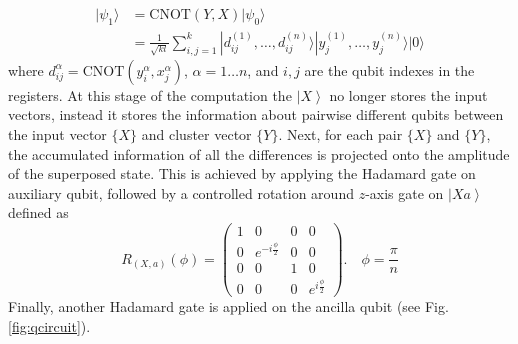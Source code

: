 \documentclass[pra,showkeys,twocolumn,showpacs]{revtex4-1}
\begin{document}
\begin{align}
    | \psi_1 \rangle & = 
    \mathrm{CNOT} (Y,X)| \psi_0 \rangle \nonumber \\
		& =  
    \frac{1}{\sqrt{kl}} \sum_{i, j=1}^{k} 
    | d^{(1)}_{ij}, \dots, d^{(n)}_{ij} \rangle 
    | y^{(1)}_j, \dots, y^{(n)}_j \rangle
    | 0 \rangle 
\end{align}
%
where $d^\alpha_{ij} = \mathrm{CNOT}(y^\alpha_i, x^\alpha_j)$, $\alpha = 1 \dots n$, and $i,j$ are the qubit indexes in the registers. 
At this stage of the computation the $\left| X \right\rangle$ no longer stores the input vectors,
instead it stores the information about pairwise different qubits between the input vector $\{X\}$ and cluster vector $\{Y\}$. 
Next, for each pair $\{X\}$ and $\{Y\}$, the accumulated information of all the differences is projected onto the amplitude of the superposed state. 
This is achieved by applying the Hadamard gate on auxiliary qubit, 
followed by a controlled rotation around $z$-axis gate on $\left| Xa \right\rangle$ defined as
%
\begin{equation}
    \label{eq:control_phase_rotation}
    R_{(X,a)}(\phi) = 
    \begin{pmatrix}
        1 & 0 & 0 & 0 \\
        0 & e^{-i \frac \phi 2} & 0 & 0 \\
        0 & 0 & 1 & 0 \\
		0 & 0 & 0 & e^{i \frac \phi 2}
    \end{pmatrix} .
    \quad \phi = \frac{\pi}{n}
\end{equation}
%
Finally, another Hadamard gate is applied on the ancilla qubit (see Fig. \ref{fig:qcircuit}). 
\end{document}
